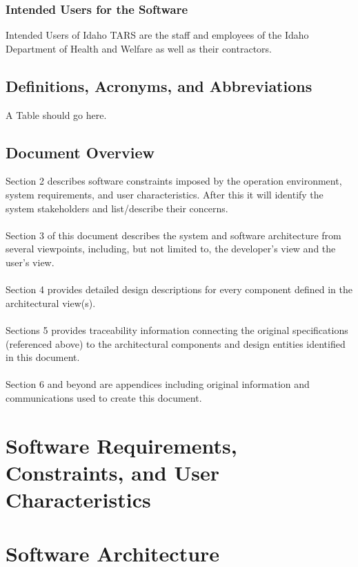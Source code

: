 \documentclass[letterpaper]{article}
\begin{document}
\subsubsection{Intended Users for the Software}
Intended Users of Idaho TARS are the staff and employees of the Idaho Department of Health and Welfare as well as their contractors.

\subsection{\bfseries{Definitions, Acronyms, and Abbreviations}}
A Table should go here. 

\subsection{\bfseries{Document Overview}}
Section 2 describes software constraints imposed by the operation environment, system requirements, and user characteristics. After this it will identify the system stakeholders and list/describe their concerns.  \\
\\
Section 3 of this document describes the system and software
architecture from several viewpoints, including, but not limited to,
the developer{\textquoteright}s view and the user{\textquoteright}s
view.\\
\\
Section 4 provides detailed design descriptions for every component
defined in the architectural view(s). \\
\\
Sections 5 provides traceability information connecting the original specifications
(referenced above) to the architectural components and design entities identified in this document.\\
\\
Section 6 and beyond are appendices including original information and communications used to create this document.
\section{\bfseries{Software Requirements, Constraints, and User Characteristics}}
%
\section{Software Architecture}
\end{document}
